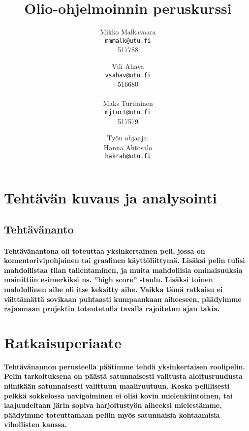 \documentclass[10pt,a4paper,draft]{article}
\newcommand{\subtitle}[1]{%
  \posttitle{
    \par\end{center}
    \begin{center}\large#1\end{center}
    \vskip0.5cm}
}
\begin{document}
\author{
	Mikko Malkavaara\\
	\texttt{mmmalk@utu.fi}\\
	517788
	\and
	Vili Ahava\\
	\texttt{vsahav@utu.fi}\\
	516680\\
	\\
	\hspace{-4.5cm}
	Maks Turtiainen\\
	\hspace{-4.5cm}
	\texttt{mjturt@utu.fi}\\
	\hspace{-4.5cm}
	517579
}
\date{\vfill
Työn ohjaaja:\\
Hanna Ahtosalo\\
\texttt{hakrah@utu.fi}}
\title{Olio-ohjelmoinnin peruskurssi}
\subtitle{Harjoitustyö\vspace{5cm}}
\begin{titlingpage}
	\maketitle
\end{titlingpage}
\tableofcontents
\newpage
\section{Tehtävän kuvaus ja analysointi}
\subsection{Tehtävänanto}
\paragraph{Tehtävänantona oli toteuttaa yksinkertainen peli, jossa on komentorivipohjainen tai graafinen käyttöliittymä. Lisäksi pelin tulisi mahdollistaa tilan tallentaminen, ja muita mahdollisia ominaisuuksia mainittiin esimerkiksi ns. ''high score'' -taulu. Lisäksi toinen mahdollinen aihe oli itse keksitty aihe. Vaikka tämä ratkaisu ei välttämättä sovikaan puhtaasti kumpaankaan aiheeseen, päädyimme rajaamaan projektin toteutetulla tavalla rajoitetun ajan takia.}

\section{Ratkaisuperiaate}
\paragraph{Tehtävänannon perusteella päätimme tehdä yksinkertaisen roolipelin. Pelin tarkoituksena on päästä satunnaisesti valitusta aloitusruudusta niinikään satunnaisesti valittuun maaliruutuun. Koska pelillisesti pelkkä sokkelossa navigoiminen ei olisi kovin mielenkiintoinen, tai laajuudeltaan järin sopiva harjoitustyön aiheeksi mielestämme, päädyimme toteuttamaan peliin myös satunnaisia kohtaamisia vihollisten kanssa.}
\end{document}
